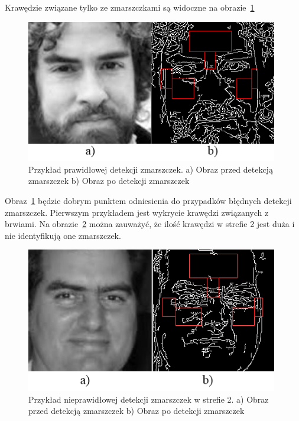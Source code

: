 \documentclass[a4paper,twoside,12pt]{book}
\begin{document}
    Krawędzie związane tylko ze zmarszczkami są widoczne na obrazie~\ref{fig.dobryRyjek}
    \begin{figure}
        \centering
        \includegraphics[width=11cm]{Obrazy/dobryRyjekWszystkieStrefyGray.jpg}
        \captionsetup{justification=centering}
        \caption{Przykład prawidłowej detekcji zmarszczek. \newline
        a) Obraz przed detekcją zmarszczek b) Obraz po detekcji zmarszczek}
        \label{fig.dobryRyjek}
    \end{figure}
    Obraz~\ref{fig.dobryRyjek} będzie dobrym punktem odniesienia do przypadków błędnych detekcji zmarszczek.
    Pierwszym przykładem jest wykrycie krawędzi związanych z brwiami. Na obrazie~\ref{fig.zlyRyjek} można zauważyć,
    że ilość krawędzi w strefie 2 jest duża i nie identyfikują one zmarszczek.
    \begin{figure}
        \centering
        \includegraphics[width=11cm]{Obrazy/brwi.png}
        \captionsetup{justification=centering}
        \caption{Przykład nieprawidłowej detekcji zmarszczek w strefie 2. \newline
        a) Obraz przed detekcją zmarszczek b) Obraz po detekcji zmarszczek }
        \label{fig.zlyRyjek}
    \end{figure}
\end{document}
